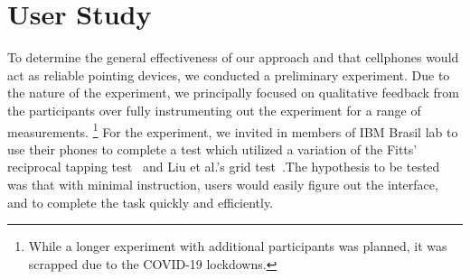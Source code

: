 \section{User Study}

To determine the general effectiveness of our approach and that cellphones
would act as reliable pointing devices, we conducted a preliminary experiment.
Due to the nature of the experiment, we principally focused on qualitative
feedback from the participants over fully instrumenting out the experiment for
a range of measurements. \footnote{While a longer experiment with additional 
participants was planned, it was scrapped due to the COVID-19 lockdowns.}
For the experiment, we invited in members of IBM Brasil lab to use their phones 
to complete a test which utilized a variation of the Fitts' reciprocal tapping 
test~\cite{fitts_information_1954} and Liu et al.'s grid 
test~\cite{liu_effects_2014}.The hypothesis to be tested was that with minimal 
instruction, users would easily figure out the interface, and to complete the 
task quickly and efficiently.











